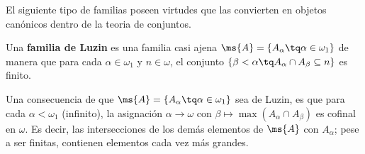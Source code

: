 	El siguiente tipo de familias poseen virtudes que las convierten en objetos canónicos dentro de la teoria  de conjuntos.

	\begin{definicion}\label{def-LuzinFam}
		Una \textbf{familia de Luzin} es una familia casi ajena $\ms{A}=\{A_\alpha \tq \alpha \in \omega_1 \}$ de manera que para cada $\alpha \in \omega_1$ y $n \in \omega$, el conjunto $ \{ \beta<\alpha \tq A_\alpha \cap A_\beta \subseteq n \} $ es finito.
	\end{definicion}

	Una consecuencia de que $\ms{A}=\{A_\alpha \tq \alpha \in \omega_1 \}$ sea de Luzin, es que para cada $\alpha<\omega_1$ (infinito), la asignación $\alpha \to \omega$ con $\beta \mapsto \max(A_\alpha \cap A_\beta)$ es cofinal en $\omega$. Es decir, las intersecciones de los demás elementos de $\ms{A}$ con $A_\alpha$; pese a ser finitas, contienen elementos cada vez más grandes.

